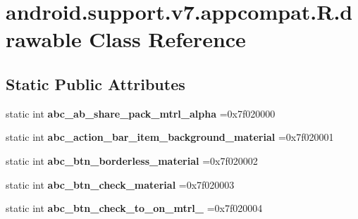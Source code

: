 \hypertarget{classandroid_1_1support_1_1v7_1_1appcompat_1_1R_1_1drawable}{}\section{android.\+support.\+v7.\+appcompat.\+R.\+drawable Class Reference}
\label{classandroid_1_1support_1_1v7_1_1appcompat_1_1R_1_1drawable}
\subsection*{Static Public Attributes}
\begin{DoxyCompactItemize}
\item 
\mbox{\label{classandroid_1_1support_1_1v7_1_1appcompat_1_1R_1_1drawable_a20b3e368f7c8b822595cd3b97c5f3af5}} 
static int {\bfseries abc\+\_\+ab\+\_\+share\+\_\+pack\+\_\+mtrl\+\_\+alpha} =0x7f020000
\item 
\mbox{\label{classandroid_1_1support_1_1v7_1_1appcompat_1_1R_1_1drawable_aa95a83e4435308d555baac9f850ed04f}} 
static int {\bfseries abc\+\_\+action\+\_\+bar\+\_\+item\+\_\+background\+\_\+material} =0x7f020001
\item 
\mbox{\label{classandroid_1_1support_1_1v7_1_1appcompat_1_1R_1_1drawable_ad0fb7775e1ddc3d73b9174f99f479d5a}} 
static int {\bfseries abc\+\_\+btn\+\_\+borderless\+\_\+material} =0x7f020002
\item 
\mbox{\label{classandroid_1_1support_1_1v7_1_1appcompat_1_1R_1_1drawable_a5a049559e5ee6bb7e8fa31bb84cc3753}} 
static int {\bfseries abc\+\_\+btn\+\_\+check\+\_\+material} =0x7f020003
\item 
\mbox{\label{classandroid_1_1support_1_1v7_1_1appcompat_1_1R_1_1drawable_a0af7144a1a427239fe7615adb55c1af6}} 
static int {\bfseries abc\+\_\+btn\+\_\+check\+\_\+to\+\_\+on\+\_\+mtrl\+\_} =0x7f020004
\item 
\mbox{\label{classandroid_1_1support_1_1v7_1_1appcompat_1_1R_1_1drawable_a649be7123781f82e7e0e07f59019357f}} 

\end{DoxyCompactItemize}
